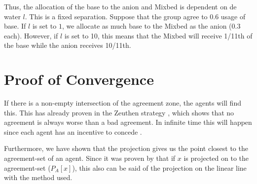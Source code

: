 Thus, the allocation of the base to the anion and Mixbed is dependent on de water $l$. This is a fixed separation. Suppose that the group agree to 0.6 usage of base. If $l$ is set to $1$, we allocate as much base to the Mixbed as the anion (0.3 each). However, if $l$ is set to 10, this means that the Mixbed will receive 1/11th of the base while the anion receives 10/11th. 

\section{Proof of Convergence}
If there is a non-empty intersection of the agreement zone, the agents will find this.
This has already proven in the Zeuthen strategy \citep{rosenschein1994rules}, which shows that no agreement is always worse than a bad agreement. In infinite time this will happen since each agent has an incentive to concede \citep{zheng2015automated}.

Furthermore, we have shown that the projection gives us the point closest to the agreement-set of an agent. Since it was proven by \citet{zheng2015automated} that if $x$ is projected on to the agreement-set  ($P_A[x]$), this also can be said of the projection on the linear line with the method used. 

